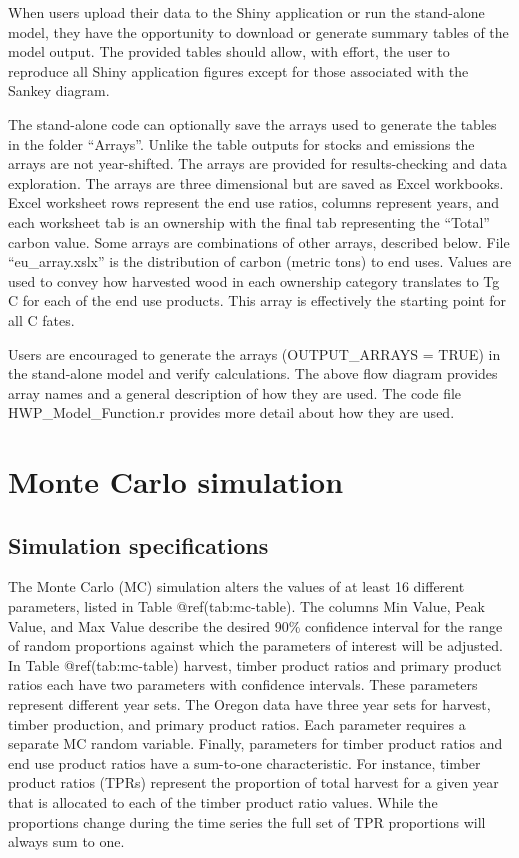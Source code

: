 \documentclass[
  openany]{book}
\begin{document}
When users upload their data to the Shiny application or run the
stand-alone model, they have the opportunity to download or generate
summary tables of the model output. The provided tables should allow,
with effort, the user to reproduce all Shiny application figures except
for those associated with the Sankey diagram.

The stand-alone code can optionally save the arrays used to generate the
tables in the folder ``Arrays''. Unlike the table outputs for stocks and
emissions the arrays are not year-shifted. The arrays are provided for
results-checking and data exploration. The arrays are three dimensional
but are saved as Excel workbooks. Excel worksheet rows represent the end
use ratios, columns represent years, and each worksheet tab is an
ownership with the final tab representing the ``Total'' carbon value.
Some arrays are combinations of other arrays, described below. File
``eu\_array.xslx'' is the distribution of carbon (metric tons) to end
uses. Values are used to convey how harvested wood in each ownership
category translates to Tg C for each of the end use products. This array
is effectively the starting point for all C fates.

Users are encouraged to generate the arrays (OUTPUT\_ARRAYS = TRUE) in
the stand-alone model and verify calculations. The above flow diagram
provides array names and a general description of how they are used. The
code file HWP\_Model\_Function.r provides more detail about how they are
used.

\hypertarget{model-mc}{%
\section{Monte Carlo simulation}\label{model-mc}}

\hypertarget{model-mc-spec}{%
\subsection{Simulation specifications}\label{model-mc-spec}}

The Monte Carlo (MC) simulation alters the values of at least 16
different parameters, listed in Table @ref(tab:mc-table). The columns
Min Value, Peak Value, and Max Value describe the desired 90\%
confidence interval for the range of random proportions against which
the parameters of interest will be adjusted. In Table @ref(tab:mc-table)
harvest, timber product ratios and primary product ratios each have two
parameters with confidence intervals. These parameters represent
different year sets. The Oregon data have three year sets for harvest,
timber production, and primary product ratios. Each parameter requires a
separate MC random variable. Finally, parameters for timber product
ratios and end use product ratios have a sum-to-one characteristic. For
instance, timber product ratios (TPRs) represent the proportion of total
harvest for a given year that is allocated to each of the timber product
ratio values. While the proportions change during the time series the
full set of TPR proportions will always sum to one.
\end{document}
